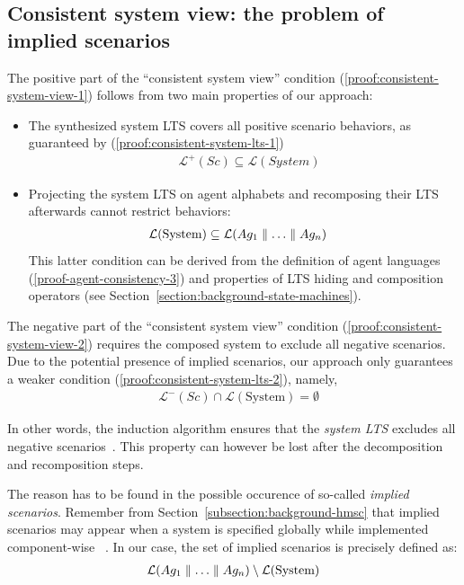 
\subsection{Consistent system view: the problem of implied scenarios\label{subsection:consistent-system-view}}

The positive part of the ``consistent system view'' condition (\ref{proof:consistent-system-view-1}) follows from two main properties of our approach:
\begin{itemize}
\item The synthesized system LTS covers all positive scenario behaviors, as guaranteed by (\ref{proof:consistent-system-lts-1})
\begin{align*}
&\mathcal{L}^+(Sc) \subseteq \mathcal{L}(System)
\end{align*}
\item Projecting the system LTS on agent alphabets and recomposing their LTS afterwards cannot restrict behaviors:
\begin{align*}
&\mathcal{L}(\mbox{System}) \subseteq \mathcal{L}(Ag_1 \parallel \ldots \parallel Ag_n)
\end{align*}
This latter condition can be derived from the definition of agent languages (\ref{proof-agent-consistency-3}) and properties of LTS hiding and composition operators (see Section~\ref{section:background-state-machines}).
\end{itemize} 

The negative part of the ``consistent system view'' condition (\ref{proof:consistent-system-view-2}) requires the composed system to exclude all negative scenarios. Due to the potential presence of implied scenarios, our approach only guarantees a weaker condition (\ref{proof:consistent-system-lts-2}), namely,
\begin{align*}
&\mathcal{L}^-(Sc) \cap \mathcal{L}(\mbox{System}) = \emptyset
\end{align*}

In other words, the induction algorithm ensures that the \emph{system LTS} excludes all negative scenarios~\cite{Oncina:1993}. This property can however be lost after the decomposition and recomposition steps.

The reason has to be found in the possible occurence of so-called \emph{implied scenarios}. Remember from Section~\ref{subsection:background-hmsc} that implied scenarios may appear when a system is specified globally while implemented component-wise ~\cite{Alur:2000, Uchitel:2004}. In our case, the set of implied scenarios is precisely defined as:
\begin{align*}
\mathcal{L}(Ag_1 \parallel \ldots \parallel Ag_n) \setminus \mathcal{L}(\mbox{System})
\end{align*}

